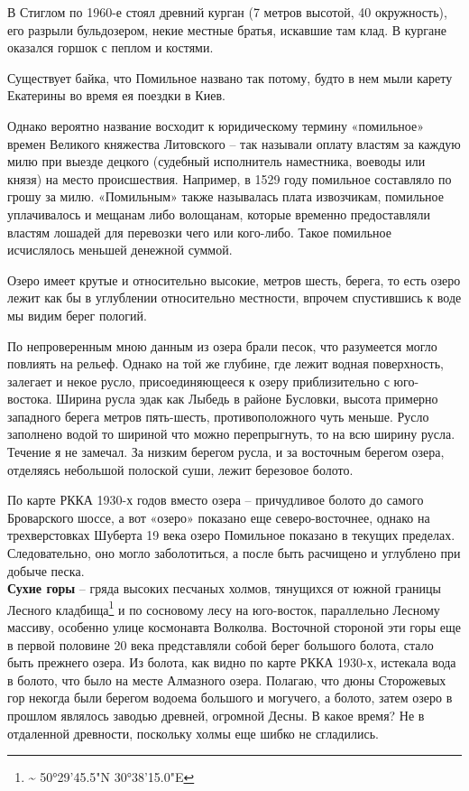 В Стиглом по 1960-е стоял древний курган (7 метров высотой, 40 окружность), его разрыли бульдозером, некие местные братья, искавшие там клад. В кургане оказался горшок с пеплом и костями.

Существует байка, что Помильное названо так потому, будто в нем мыли карету Екатерины во время ея поездки в Киев.

Однако вероятно название восходит к юридическому термину «помильное» времен Великого княжества Литовского – так называли оплату властям за каждую милю при выезде децкого (судебный исполнитель наместника, воеводы или князя) на место происшествия. Например, в 1529 году помильное составляло по грошу за милю. «Помильным» также называлась плата извозчикам, помильное уплачивалось и мещанам либо волощанам, которые временно предоставляли властям лошадей для перевозки чего или кого-либо. Такое помильное исчислялось меньшей денежной суммой.

Озеро имеет крутые и относительно высокие, метров шесть, берега, то есть озеро лежит как бы в углублении относительно местности, впрочем спустившись к воде мы видим берег пологий.
 
По непроверенным мною данным из озера брали песок, что разумеется могло повлиять на рельеф. Однако на той же глубине, где лежит водная поверхность, залегает и некое русло, присоединяющееся к озеру приблизительно с юго-востока. Ширина русла эдак как Лыбедь в районе Бусловки, высота примерно западного берега метров пять-шесть, противоположного чуть меньше. Русло заполнено водой то шириной что можно перепрыгнуть, то на всю ширину русла. Течение я не замечал. За низким берегом русла, и за восточным берегом озера, отделяясь небольшой полоской суши, лежит березовое болото.

По карте РККА 1930-х годов вместо озера – причудливое болото до самого Броварского шоссе, а вот «озеро» показано еще северо-восточнее, однако на трехверстовках Шуберта 19 века озеро Помильное показано в текущих пределах. Следовательно, оно могло заболотиться, а после быть расчищено и углублено при добыче песка.\\




\textbf{Сухие горы} – гряда высоких песчаных холмов, тянущихся от южной границы Лесного кладбища\footnote{\textasciitilde{} 50°29'45.5"N 30°38'15.0"E} и по сосновому лесу на юго-восток, параллельно Лесному массиву, особенно улице космонавта Волколва. Восточной стороной эти горы еще в первой половине 20 века представляли собой берег большого болота, стало быть прежнего озера. Из болота, как видно по карте РККА 1930-х, истекала вода в болото, что было на месте Алмазного озера. Полагаю, что дюны Сторожевых гор некогда были берегом водоема большого и могучего, а болото, затем озеро в прошлом являлось заводью древней, огромной Десны. В какое время? Не в отдаленной древности, поскольку холмы еще шибко не сгладились.

